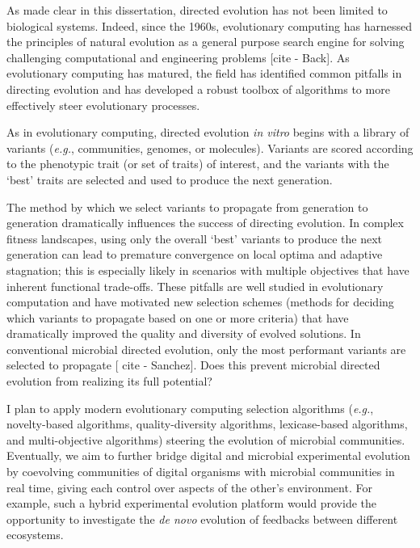 As made clear in this dissertation, directed evolution has not been limited to biological systems. 
Indeed, since the 1960s, evolutionary computing has harnessed the principles of natural evolution as a general purpose search engine for solving challenging computational and engineering problems [cite - Back]. 
As evolutionary computing has matured, the field has identified common pitfalls in directing evolution and has developed a robust toolbox of algorithms to more effectively steer evolutionary processes.

As in evolutionary computing, directed evolution \textit{in vitro} begins with a library of variants (\textit{e.g.}, communities, genomes, or molecules). 
Variants are scored according to the phenotypic trait (or set of traits) of interest, and the variants with the `best' traits are selected and used to produce the next generation.

The method by which we select variants to propagate from generation to generation dramatically influences the success of directing evolution. 
In complex fitness landscapes, using only the overall `best' variants to produce the next generation can lead to premature convergence on local optima and adaptive stagnation; 
this is especially likely in scenarios with multiple objectives that have inherent functional trade-offs.
These pitfalls are well studied in evolutionary computation and have motivated new selection schemes (methods for deciding which variants to propagate based on one or more criteria) that have dramatically improved the quality and diversity of evolved solutions.
In conventional microbial directed evolution, only the most performant variants are selected to propagate [ cite - Sanchez].
Does this prevent microbial directed evolution from realizing its full potential?

I plan to apply modern evolutionary computing selection algorithms (\textit{e.g.}, novelty-based algorithms, quality-diversity algorithms, lexicase-based algorithms, and multi-objective algorithms) steering the evolution of microbial communities.
Eventually, we aim to further bridge digital and microbial experimental evolution by coevolving communities of digital organisms with microbial communities in real time, giving each control over aspects of the other's environment.
For example, such a hybrid experimental evolution platform would provide the opportunity to investigate the \textit{de novo} evolution of feedbacks between different ecosystems.



